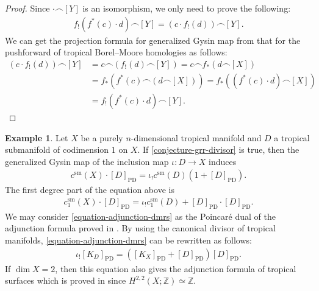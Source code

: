 \documentclass[a4paper,dvipdfmx,reqno,12pt]{amsart}
\theoremstyle{definition}
\newtheorem{example}[theorem]{Example}
\newcommand{\PD}[1]{[#1]_{\mathrm{PD}}}
\numberwithin{equation}{section}
\begin{document}
\begin{proof}
Since $\cdot \frown [Y]$ is an isomorphism, we only need
to prove the following:
\begin{align}
    f_!(f^{*}(c)\cdot d)\frown [Y]=(c\cdot f_!(d))\frown [Y].
\end{align}
We can get the projection formula for generalized Gysin
map from that for the pushforward of tropical 
Borel--Moore homologies as follows:
\begin{align}
(c\cdot f_!(d))\frown [Y]&=
c\frown(f_!(d)\frown [Y])=
c\frown f_*(d\frown [X])\\
&=f_*(f^*(c)\frown (d\frown [X]))
=f_*((f^*(c)\cdot d) \frown [X]) \\
&=f_!(f^{*}(c)\cdot d)\frown [Y].
\end{align}
\end{proof}

\begin{example}
\label{example-grr-1}
Let $X$ be a purely $n$-dimensional tropical manifold
and $D$ a tropical submanifold of codimension $1$ on 
$X$. If \cref{conjecture-grr-divisor} is true, then
the generalized Gysin map of the inclusion map
$\iota\colon D\to X$ induces
\begin{align}
c^{\mathrm{sm}}(X)\cdot \PD{D}=\iota_!c^{\mathrm{sm}}(D)
(1+\PD{D}).
\end{align}
The first degree part of the equation above is
\begin{align}
\label{equation-adjunction-dmrs}
c^{\mathrm{sm}}_{1}(X)\cdot \PD{D}=\iota_!c^{\mathrm{sm}}_1(D)
+\PD{D}\cdot \PD{D}.
\end{align}
We may consider \cref{equation-adjunction-dmrs} as 
the Poincar\'e dual of the adjunction formula proved in
\cite[Theorem 5.2]{demedrano2023chern}.
By using the canonical divisor of tropical manifolds,
\eqref{equation-adjunction-dmrs} can be rewritten as follows:
\begin{align}
\iota_! \PD{K_D}=(\PD{K_X}+\PD{D})\PD{D}.
\end{align}
If $\dim X=2$, then this equation also gives
the adjunction formula of tropical surfaces which is proved
in \cite[Theorem 4.11]{shaw2015tropical}
since $H^{2,2}(X;\mathbb{Z})\simeq \mathbb{Z}$.
\end{example}
\end{document}
